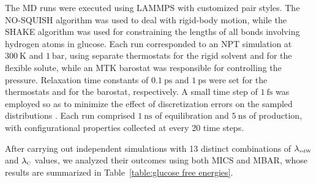 \documentclass[
    journal=jctcce,
    layout=twocolumn
]{achemso}
\begin{document}
The MD runs were executed using LAMMPS \cite{Plimpton_1995} with customized pair styles. The NO-SQUISH algorithm \cite{Dullweber_1997, Miller_2002, Silveira_2017} was used to deal with rigid-body motion, while the SHAKE algorithm \cite{Ryckaert_1977} was used for constraining the lengths of all bonds involving hydrogen atoms in glucose. Each run corresponded to an NPT simulation at $300~\text{K}$ and $1~\text{bar}$, using separate thermostats for the rigid solvent\cite{Kamberaj_2005} and for the flexible solute\cite{Martyna_1994}, while an MTK barostat\cite{Martyna_1994} was responsible for controlling the pressure. Relaxation time constants of $0.1~\text{ps}$ and $1~\text{ps}$ were set for the thermostats and for the barostat, respectively. A small time step of $1~\text{fs}$ was employed so as to minimize the effect of discretization errors on the sampled distributions \cite{Davidchack_2012, Silveira_2017}. Each run comprised $1~\text{ns}$ of equilibration and $5~\text{ns}$ of production, with configurational properties collected at every 20 time steps.

After carrying out independent simulations with 13 distinct combinations of $\lambda_\text{\tiny vdW}$ and $\lambda_\text{\tiny C}$ values, we analyzed their outcomes using both MICS and MBAR, whose results are summarized in Table~\ref{table:glucose free energies}. %


\end{document}
